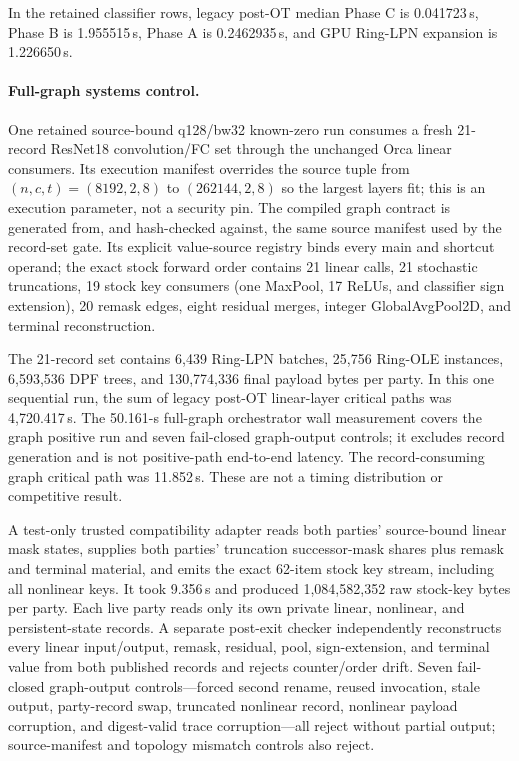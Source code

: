 \documentclass[11pt]{article}
\begin{document}
In the retained classifier rows, legacy post-OT median Phase C is 0.041723\,s, Phase B is
1.955515\,s, Phase A is 0.2462935\,s, and GPU Ring-LPN expansion is
1.226650\,s.

\paragraph{Full-graph systems control.}
One retained source-bound q128/bw32 known-zero run consumes a fresh 21-record
ResNet18 convolution/FC set through the unchanged Orca linear consumers. Its
execution manifest overrides the source tuple from $(n,c,t)=(8192,2,8)$ to
$(262144,2,8)$ so the largest layers fit; this is an execution parameter, not a
security pin. The compiled graph contract is generated from, and hash-checked
against, the same source manifest used by the record-set gate. Its explicit
value-source registry binds every main and shortcut operand; the exact stock
forward order contains 21 linear calls, 21 stochastic truncations, 19 stock key
consumers (one MaxPool, 17 ReLUs, and classifier sign extension), 20 remask
edges, eight residual merges, integer GlobalAvgPool2D, and terminal
reconstruction.

The 21-record set contains 6{,}439 Ring-LPN batches, 25{,}756 Ring-OLE
instances, 6{,}593{,}536 DPF trees, and 130{,}774{,}336 final payload bytes per
party. In this one sequential run, the sum of legacy post-OT linear-layer
critical paths was 4{,}720.417\,s. The 50.161-s full-graph orchestrator wall
measurement covers the graph positive run and seven fail-closed graph-output
controls; it excludes record generation and is not positive-path end-to-end
latency. The record-consuming graph critical path was 11.852\,s. These
are not a timing distribution or competitive result.

A test-only trusted compatibility adapter reads both parties' source-bound
linear mask states, supplies both parties' truncation successor-mask shares
plus remask and terminal material, and emits the exact 62-item stock key stream,
including all nonlinear keys. It took 9.356\,s and produced
1{,}084{,}582{,}352 raw stock-key bytes per party. Each live party reads only
its own private linear, nonlinear, and persistent-state records. A separate
post-exit checker independently reconstructs every linear input/output, remask,
residual, pool, sign-extension, and terminal value from both published records
and rejects counter/order drift. Seven fail-closed
graph-output controls---forced second rename, reused invocation, stale output,
party-record swap, truncated nonlinear record, nonlinear payload corruption,
and digest-valid trace corruption---all reject without partial output;
source-manifest and topology mismatch controls also reject.
\end{document}
